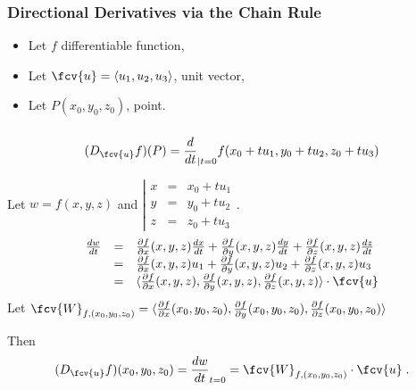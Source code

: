 \begin{frame}
\frametitle{Directional Derivatives via the Chain Rule}
\begin{itemize}
  \item Let $f$ differentiable function,
  \item Let $\fcv{u}=\langle u_1,u_2,u_3 \rangle$, unit vector,
  \item Let $P(x_0,y_0,z_0)$, point.
\end{itemize}

\end{frame}

\begin{frame}
\frametitle{}
\[
(D_{\fcv{u}}f)(P) =  \frac{d}{dt}_{|t=0} f(x_0+tu_1, y_0+tu_2,z_0+tu_3)
\]

Let $w =f(x,y,z)$ and
$\left|\begin{array}{rcl}
x&=& x_0 + tu_1 \\
y&=& y_0 + tu_2 \\
z&=& z_0 + tu_3
\end{array}\right.$.
\pause
\[\begin{array}{rcl}
\frac{dw}{dt} &= & \frac{\partial f}{\partial x}(x,y,z) \frac{dx}{dt} + \frac{\partial f}{\partial y}(x,y,z) \frac{dy}{dt} + \frac{\partial f}{\partial z}(x,y,z) \frac{dz}{dt}  \\
&= & \frac{\partial f}{\partial x}(x,y,z) u_1 + \frac{\partial f}{\partial y}(x,y,z) u_2 + \frac{\partial f}{\partial z}(x,y,z) u_3 \\
&= & \langle \frac{\partial f}{\partial x}(x,y,z) , \frac{ \partial f}{ \partial y}(x,y,z), \frac{\partial f}{\partial z}(x,y,z)\rangle \cdot \fcv{u}
\end{array}
\]
\pause
Let $\fcv{W}_{f,(x_0,y_0,z_0)} =\langle \frac{\partial f}{\partial x}(x_0,y_0,z_0) , \frac{\partial f}{\partial y}(x_0,y_0,z_0), \frac{\partial f}{\partial z}(x_0,y_0,z_0)\rangle$

\pause
Then
%
\[(D_{\fcv{u}}f)(x_0,y_0,z_0) = \frac{dw}{dt}_{t=0} = \fcv{W}_{f,(x_0,y_0,z_0)} \cdot \fcv{u}\; .\]

\end{frame}

